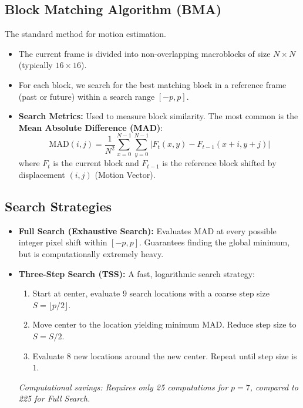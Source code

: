\documentclass[12pt,a4paper]{article}
\begin{document}
\subsection{Block Matching Algorithm (BMA)}
The standard method for motion estimation.
\begin{itemize}[leftmargin=*, itemsep=3pt]
  \item The current frame is divided into non-overlapping macroblocks of size $N \times N$ (typically $16 \times 16$).
  \item For each block, we search for the best matching block in a reference frame (past or future) within a search range $[-p, p]$.
  \item \textbf{Search Metrics:} Used to measure block similarity. The most common is the \textbf{Mean Absolute Difference (MAD)}:
    \begin{equation}
      \text{MAD}(i,j) = \frac{1}{N^2} \sum_{x=0}^{N-1} \sum_{y=0}^{N-1} \left| F_t(x,y) - F_{t-1}(x+i, y+j) \right|
    \end{equation}
    where $F_t$ is the current block and $F_{t-1}$ is the reference block shifted by displacement $(i,j)$ (Motion Vector).
\end{itemize}

\subsection{Search Strategies}
\begin{itemize}[leftmargin=*, itemsep=3.5pt]
  \item \textbf{Full Search (Exhaustive Search):} Evaluates MAD at every possible integer pixel shift within $[-p, p]$. Guarantees finding the global minimum, but is computationally extremely heavy.
  \item \textbf{Three-Step Search (TSS):} A fast, logarithmic search strategy:
    \begin{enumerate}[label=\alph*., leftmargin=1.5em, itemsep=1.5pt]
      \item Start at center, evaluate 9 search locations with a coarse step size $S = \lfloor p/2 \rfloor$.
      \item Move center to the location yielding minimum MAD. Reduce step size to $S = S/2$.
      \item Evaluate 8 new locations around the new center. Repeat until step size is $1$.
    \end{enumerate}
    \textit{Computational savings: Requires only 25 computations for $p=7$, compared to 225 for Full Search.}
\end{itemize}
\end{document}
